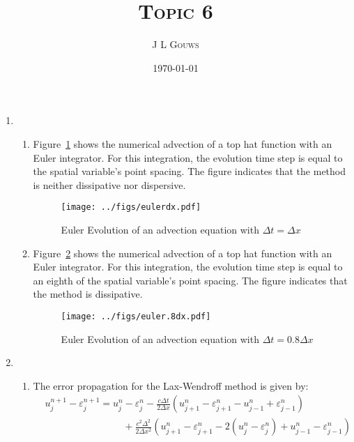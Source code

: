 \documentclass[12pt,a4]{article}
\title{
\textsc{Topic 6}
}
\author{\textsc{J L Gouws}
}
\date{\today
\\[1cm]}
\begin{document}
\thispagestyle{empty}

\maketitle

\begin{enumerate}
  \item
    \begin{enumerate}
      \item
        Figure~\ref{fig:eulerdx} shows the numerical advection of a top hat function with an Euler integrator.
        For this integration, the evolution time step is equal to the spatial variable's point spacing.
        The figure indicates that the method is neither dissipative nor dispersive.
        \begin{figure}[H]
          \centering
          \texttt{[image: ../figs/eulerdx.pdf]}
          \caption{Euler Evolution of an advection equation with $\Delta t = \Delta x$}
          \label{fig:eulerdx}
        \end{figure}
      \item
        Figure~\ref{fig:euler.8dx} shows the numerical advection of a top hat function with an Euler integrator.
        For this integration, the evolution time step is equal to an eighth of the spatial variable's point spacing.
        The figure indicates that the method is dissipative.
        \begin{figure}[H]
          \centering
          \texttt{[image: ../figs/euler.8dx.pdf]}
          \caption{Euler Evolution of an advection equation with $\Delta t = 0.8 \Delta x$}
          \label{fig:euler.8dx}
        \end{figure}
    \end{enumerate}
  \item
    \begin{enumerate}
      \item
        The error propagation for the Lax-Wendroff method is given by:
        \begin{align*}
                      & u^{n+1}_j - \varepsilon^{n+1}_j = u^{n}_j - \varepsilon^{n}_j - \frac{c \Delta t}{2\Delta x} (u^{n}_{j + 1} - \varepsilon^{n}_{j+1} - u^{n}_{j - 1} + \varepsilon^{n}_{j-1})\\
                      & \qquad \qquad \qquad \qquad + \frac{c^2 \Delta^2}{2 \Delta x^2}(u^n_{j + 1} - \varepsilon^n_{j+1} - 2(u^n_j - \varepsilon^n_j) + u^n_{j-1} - \varepsilon^n_{j-1})\\

\end{align*}
\end{enumerate}
\end{enumerate}
\end{document}
